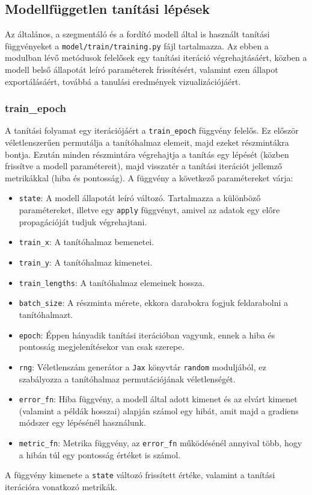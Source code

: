 \subsection{Modellfüggetlen tanítási lépések}
Az általános, a szegmentáló és a fordító modell által is használt
tanítási függvényeket a \texttt{model/train/training.py} fájl
tartalmazza. Az ebben a modulban lévő metódusok felelősek egy tanítási iteráció
végrehajtásáért, közben a modell belső állapotát leíró paraméterek frissítésért,
valamint ezen állapot exportálásáért, továbbá a tanulási eredmények vizualizációjáért.

\subsubsection{train\_epoch}
A tanítási folyamat egy iterációjáért a \texttt{train\_epoch} függvény felelős. Ez először
véletlenszerűen permutálja a tanítóhalmaz elemeit, majd ezeket részmintákra bontja. Ezután
minden részmintára végrehajtja a tanítás egy lépését (közben frissítve a modell paramétereit),
majd visszatér a tanítási iterációt jellemző metrikákkal (hiba és pontosság). A függvény
a következő paramétereket várja:
\begin{itemize}
    \item \texttt{state}: A modell állapotát leíró változó. Tartalmazza a különböző paramétereket,
        illetve egy \texttt{apply} függvényt, amivel az adatok egy előre propagációját tudjuk végrehajtani.
    \item \texttt{train\_x}: A tanítóhalmaz bemenetei.
    \item \texttt{train\_y}: A tanítóhalmaz kimenetei.
    \item \texttt{train\_lengths}: A tanítóhalmaz elemeinek hossza.
    \item \texttt{batch\_size}: A részminta mérete, ekkora darabokra fogjuk feldarabolni a tanítóhalmazt.
    \item \texttt{epoch}: Éppen hányadik tanítási iterációban vagyunk, ennek a hiba és pontosság
        megjelenítésekor van csak szerepe.
    \item \texttt{rng}: Véletlenszám generátor a \texttt{Jax} könyvtár \texttt{random} moduljából,
        ez szabályozza a tanítóhalmaz permutációjának véletlenségét.
    \item \texttt{error\_fn}: Hiba függvény, a modell által adott kimenet és az elvárt kimenet (valamint
        a példák hosszai) alapján számol egy hibát, amit majd a gradiens módszer egy lépésénél használunk.
    \item \texttt{metric\_fn}: Metrika függvény, az \texttt{error\_fn} működésénél annyival több,
        hogy a hibán túl egy pontosság értéket is számol.
\end{itemize}
A függvény kimenete a \texttt{state} változó frissített értéke, valamint a tanítási iterációra
vonatkozó metrikák.

